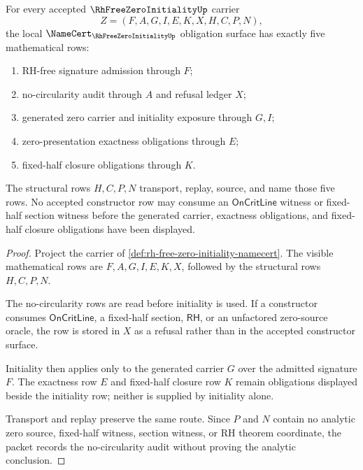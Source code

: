 \begin{theorem}
\label{thm:rh-free-zero-initiality-no-fixed-half-circularity}
For every accepted $\RhFreeZeroInitialityUp$ carrier
$$
Z=(F,A,G,I,E,K,X,H,C,P,N),
$$
the local $\NameCert_{\RhFreeZeroInitialityUp}$ obligation surface has exactly five mathematical rows:
\begin{enumerate}
\item RH-free signature admission through $F$;
\item no-circularity audit through $A$ and refusal ledger $X$;
\item generated zero carrier and initiality exposure through $G,I$;
\item zero-presentation exactness obligations through $E$;
\item fixed-half closure obligations through $K$.
\end{enumerate}
The structural rows $H,C,P,N$ transport, replay, source, and name those five rows. No accepted constructor row may consume an $\mathsf{OnCritLine}$ witness or fixed-half section witness before the generated carrier, exactness obligations, and fixed-half closure obligations have been displayed.
\end{theorem}
\begin{proof}
Project the carrier of \autoref{def:rh-free-zero-initiality-namecert}. The visible mathematical rows are $F,A,G,I,E,K,X$, followed by the structural rows $H,C,P,N$.

The no-circularity rows are read before initiality is used. If a constructor consumes $\mathsf{OnCritLine}$, a fixed-half section, $\mathsf{RH}$, or an unfactored zero-source oracle, the row is stored in $X$ as a refusal rather than in the accepted constructor surface.

Initiality then applies only to the generated carrier $G$ over the admitted signature $F$. The exactness row $E$ and fixed-half closure row $K$ remain obligations displayed beside the initiality row; neither is supplied by initiality alone.

Transport and replay preserve the same route. Since $P$ and $N$ contain no analytic zero source, fixed-half witness, section witness, or RH theorem coordinate, the packet records the no-circularity audit without proving the analytic conclusion.
\end{proof}


